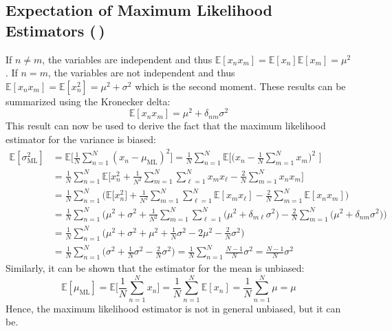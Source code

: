 \documentclass[11pt, a4paper]{scrartcl}
\newcommand{\E}{\mathbb{E}}
\newcommand{\diffstar}{\texorpdfstring{\raisebox{-1pt}{\resizebox{!}{8pt}{\(\star\)}}}{*}}
\newcommand{\twostar}  {(\diffstar\,\diffstar)}
\begin{document}
		\subsection{Expectation of Maximum Likelihood Estimators  \twostar}
			If \(n \neq m\), the variables are independent and thus \( \E[x_n x_m] = \E[x_n] \E[x_m] = \mu^2 \). If \(n = m\), the variables are not independent and thus \( \E[x_n x_m] = \E[x_n^2] = \mu^2 + \sigma^2 \) which is the second moment. These results can be summarized using the Kronecker delta:
			\begin{equation}
				\E[x_n x_m] = \mu^2 + \delta_{nm} \sigma^2
			\end{equation}
			This result can now be used to derive the fact that the maximum likelihood estimator for the variance is biased:
			\begin{align}
				\E[\sigma^2_\mathrm{ML}]
					&= \E\Bigg[ \frac{1}{N} \sum_{n = 1}^{N} (x_n - \mu_\mathrm{ML})^2 \Bigg]
					 = \frac{1}{N} \sum_{n = 1}^{N} \E\Bigg[ \Bigg( x_n - \frac{1}{N} \sum_{m = 1}^{N} x_m \Bigg)^{\!\!2}\,\, \Bigg] \\
					&= \frac{1}{N} \sum_{n = 1}^{N} \E\Bigg[ x_n^2 + \frac{1}{N^2} \sum_{m = 1}^{N} \sum_{\ell = 1}^{N} x_m x_\ell - \frac{2}{N} \sum_{m = 1}^{N} x_n x_m \Bigg] \\
					&= \frac{1}{N} \sum_{n = 1}^{N} \Bigg( \E\big[x_n^2\big] + \frac{1}{N^2} \sum_{m = 1}^{N} \sum_{\ell = 1}^{N} \E[x_m x_\ell] - \frac{2}{N} \sum_{m = 1}^{N} \E[x_n x_m] \Bigg) \\
					&= \frac{1}{N} \sum_{n = 1}^{N} \Bigg( \mu^2 + \sigma^2 + \frac{1}{N^2} \sum_{m = 1}^{N} \sum_{\ell = 1}^{N} \big(\mu^2 + \delta_{m\ell} \sigma^2\big) - \frac{2}{N} \sum_{m = 1}^{N} \big(\mu^2 + \delta_{nm} \sigma^2\big) \Bigg) \\
					&= \frac{1}{N} \sum_{n = 1}^{N} \Big( \mu^2 + \sigma^2 + \mu^2 + \frac{1}{N} \sigma^2 - 2 \mu^2 - \frac{2}{N} \sigma^2 \Big) \\
					&= \frac{1}{N} \sum_{n = 1}^{N} \Big( \sigma^2 + \frac{1}{N} \sigma^2 - \frac{2}{N} \sigma^2 \Big)
					 = \frac{1}{N} \sum_{n = 1}^{N} \frac{N - 1}{N} \sigma^2
					 = \frac{N - 1}{N} \sigma^2
			\end{align}
			Similarly, it can be shown that the estimator for the mean is unbiased:
			\begin{equation}
				\E[\mu_\mathrm{ML}]
					= \E\Bigg[ \frac{1}{N} \sum_{n = 1}^{N} x_n \Bigg]
					= \frac{1}{N} \sum_{n = 1}^{N} \E[x_n]
					= \frac{1}{N} \sum_{n = 1}^{N} \mu
					= \mu
			\end{equation}
			Hence, the maximum likelihood estimator is not in general unbiased, but it can be.
\end{document}

